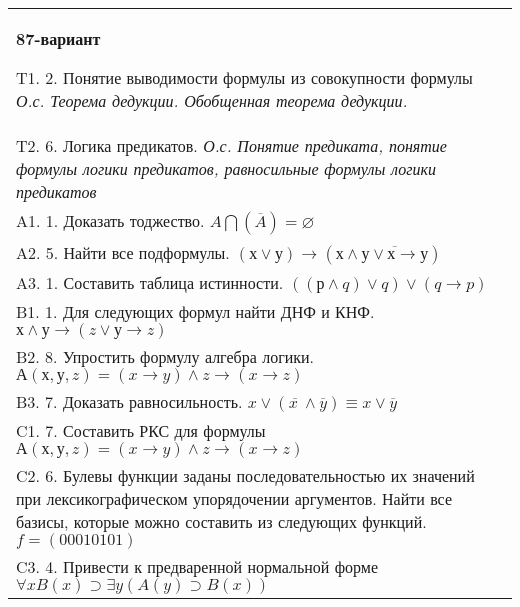 \documentclass{article}
\begin{document}
\begin{tabular}{m{17cm}}
\textbf{87-вариант}
\newline

T1. 2. Понятие выводимости формулы из совокупности формулы \emph{О.с. Теорема дедукции. Обобщенная теорема дедукции.} \\
T2. 6. Логика предикатов. \emph{О.с. Понятие предиката, понятие формулы логики предикатов, равносильные формулы логики предикатов} \\
A1. 1. Доказать тоджество. \(A\bigcap(\overline{A}) = \varnothing\) \\
A2. 5. Найти все подформулы. \((х \vee у) \rightarrow \left( х \land \overline{у \vee х \rightarrow у} \right)\) \\
A3. 1. Составить таблица истинности. \(\left( (р \land q) \vee q \right) \vee (q \rightarrow p)\) \\
B1. 1. Для следующих формул найти ДНФ и КНФ. \(х \land у \rightarrow (z \vee у \rightarrow z)\) \\
B2. 8. Упростить формулу алгебра логики. \(А(х,у,z) = (x \rightarrow y) \land z \rightarrow (x \rightarrow z)\) \\
B3. 7. Доказать равносильность. \(x \vee \left( \overline{x\ } \land \overline{y} \right) \equiv x \vee \overline{y}\) \\
C1. 7. Составить РКС для формулы \(А(х,у,z) = (x \rightarrow y) \land z \rightarrow (x \rightarrow z)\) \\
C2. 6. Булевы функции заданы последовательностью их значений при лексикографическом упорядочении аргументов. Найти все базисы, которые можно составить из следующих функций. \(f = (00010101)\) \\
C3. 4. Привести к предваренной нормальной форме \(\forall xB(x) \supset \exists y(A(y) \supset B(x))\) \\

\end{tabular}
\vspace{1cm}
\end{document}
